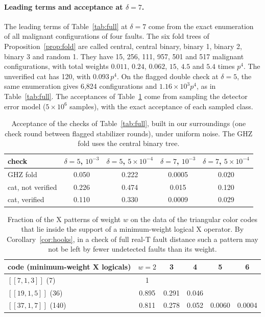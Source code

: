 \documentclass[aps,prl,reprint,twocolumn,amsmath,amssymb,floatfix,nofootinbib,superscriptaddress]{revtex4-2}
\theoremstyle{definition}
\theoremstyle{remark}
\begin{document}
\paragraph*{Leading terms and acceptance at $\delta=7$.}
The leading terms of Table~\ref{tab:full} at $\delta=7$ come from the exact enumeration of all malignant configurations of four faults. The six fold trees of Proposition~\ref{prop:fold} are called central, central binary, binary 1, binary 2, binary 3 and random 1. They have 15, 256, 111, 957, 501 and 517 malignant configurations, with total weights $0.011$, $0.24$, $0.062$, $15$, $4.5$ and $5.4$ times $p^4$. The unverified cat has 120, with $0.093\,p^4$. On the flagged double check at $\delta=5$, the same enumeration gives 6,824 configurations and $1.16\times10^3p^4$, as in Table~\ref{tab:full}. The acceptances of Table~\ref{tab:acc} come from sampling the detector error model ($5\times10^6$ samples), with the exact acceptance of each sampled class.

\begin{table}[h]
\caption{Acceptance of the checks of Table~\ref{tab:full}, built in our surroundings (one check round between flagged stabilizer rounds), under uniform noise. The GHZ fold uses the central binary tree.}
\label{tab:acc}
\begin{ruledtabular}
\begin{tabular}{lcccc}
check & $\delta=5$, $10^{-3}$ & $\delta=5$, $5\times10^{-4}$ & $\delta=7$, $10^{-3}$ & $\delta=7$, $5\times10^{-4}$ \\
\hline
GHZ fold & 0.050 & 0.222 & 0.0005 & 0.020 \\
cat, not verified & 0.226 & 0.474 & 0.015 & 0.120 \\
cat, verified & 0.110 & 0.330 & 0.0009 & 0.029 \\
\end{tabular}
\end{ruledtabular}
\end{table}

\begin{table}[h]
\caption{Fraction of the X patterns of weight $w$ on the data of the triangular color codes that lie inside the support of a minimum-weight logical X operator. By Corollary~\ref{cor:hooks}, in a check of full real-T fault distance such a pattern may not be left by fewer undetected faults than its weight.}
\label{tab:cover}
\begin{ruledtabular}
\begin{tabular}{lccccc}
code (minimum-weight X logicals) & $w=2$ & 3 & 4 & 5 & 6 \\
\hline
$[[7,1,3]]$ (7) & 1 & & & & \\
$[[19,1,5]]$ (36) & 0.895 & 0.291 & 0.046 & & \\
$[[37,1,7]]$ (140) & 0.811 & 0.278 & 0.052 & 0.0060 & 0.0004 \\
\end{tabular}
\end{ruledtabular}
\end{table}
\end{document}
